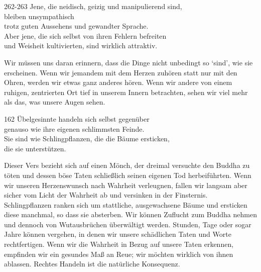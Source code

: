 
\begin{dhpVerse}{262-263}
\label{dhp-262}\label{dhp-263}
Jene, die neidisch, geizig und manipulierend sind,\\ 
bleiben unsympathisch\\ 
trotz guten Aussehens und gewandter Sprache.\\ 
Aber jene, die sich selbst von ihren Fehlern befreiten\\ 
und Weisheit kultivierten, sind wirklich attraktiv. 
\end{dhpVerse}

\begin{dhpRefl}

Wir müssen uns daran erinnern, dass die Dinge nicht unbedingt so `sind', wie
sie erscheinen. Wenn wir jemandem mit dem Herzen zuhören statt nur mit den
Ohren, werden wir etwas ganz anderes hören. Wenn wir andere von einem ruhigen,
zentrierten Ort tief in unserem Innern betrachten, sehen wir viel mehr als
das, was unsere Augen sehen.

\end{dhpRefl}


\begin{dhpVerse}{162}
\label{dhp-162}
Übelgesinnte handeln sich selbst gegenüber\\ 
genauso wie ihre eigenen schlimmsten Feinde.\\ 
Sie sind wie Schlingpflanzen, die die Bäume ersticken,\\ 
die sie unterstützen. 
\end{dhpVerse}

\begin{dhpRefl}

Dieser Vers bezieht sich auf einen Mönch, der dreimal versuchte den Buddha zu
töten und dessen böse Taten schließlich seinen eigenen Tod herbeiführten. Wenn
wir unseren Herzenswunsch nach Wahrheit verleugnen, fallen wir langsam aber
sicher vom Licht der Wahrheit ab und versinken in der Finsternis.
Schlingpflanzen ranken sich um stattliche, ausgewachsene Bäume und ersticken
diese manchmal, so dass sie absterben. Wir können Zuflucht zum Buddha nehmen
und dennoch von Wutausbrüchen überwältigt werden. Stunden, Tage oder sogar
Jahre können vergehen, in denen wir unsere schädlichen Taten und Worte
rechtfertigen. Wenn wir die Wahrheit in Bezug auf unsere Taten erkennen,
empfinden wir ein gesundes Maß an Reue; wir möchten wirklich von ihnen
ablassen. Rechtes Handeln ist die natürliche Konsequenz.

\end{dhpRefl}

